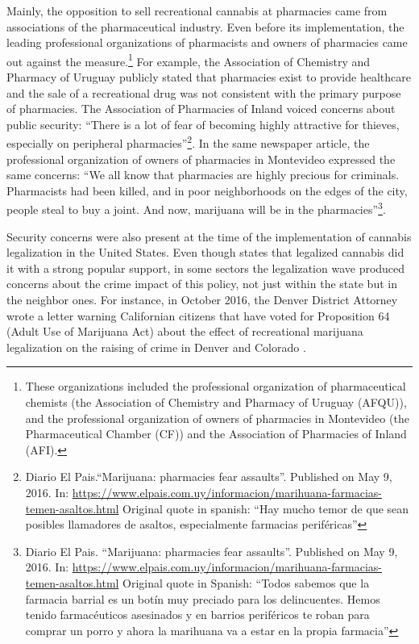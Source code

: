 \documentclass[11pt]{article}
\begin{document}
Mainly, the opposition to sell recreational cannabis at pharmacies came from associations of the pharmaceutical industry. Even before its implementation, the leading professional organizations of pharmacists and owners of pharmacies came out against the measure.\footnote{These organizations included the professional organization of pharmaceutical chemists (the Association of Chemistry and Pharmacy of Uruguay (AFQU)), and the professional organization of owners of pharmacies in Montevideo (the Pharmaceutical Chamber (CF)) and the Association of Pharmacies of Inland (AFI).} For example, the Association of Chemistry and Pharmacy of Uruguay publicly stated that pharmacies exist to provide healthcare and the sale of a recreational drug was not consistent with the primary purpose of pharmacies. The Association of Pharmacies of Inland voiced concerns about public security: ``There is a lot of fear of becoming highly attractive for thieves, especially on peripheral pharmacies''\footnote{Diario El Pais.``Marijuana: pharmacies fear assaults''. Published on May 9, 2016. In: \url{https://www.elpais.com.uy/informacion/marihuana-farmacias-temen-asaltos.html} Original quote in spanish: ``Hay mucho temor de que sean posibles llamadores de asaltos, especialmente farmacias periféricas''}. In the same newspaper article, the professional organization of owners of pharmacies in Montevideo expressed the same concerns: ``We all know that pharmacies are highly precious for criminals. Pharmacists had been killed, and in poor neighborhoods on the edges of the city, people steal to buy a joint. And now, marijuana will be in the pharmacies''\footnote{Diario El Pais. ``Marijuana: pharmacies fear assaults''. Published on May 9, 2016. In: \url{https://www.elpais.com.uy/informacion/marihuana-farmacias-temen-asaltos.html} Original quote in Spanish:  ``Todos sabemos que la farmacia barrial es un botín muy preciado para los delincuentes. Hemos tenido farmacéuticos asesinados y en barrios periféricos te roban para comprar un porro y ahora la marihuana va a estar en la propia farmacia''}.

Security concerns were also present at the time of the implementation of cannabis legalization in the United States. Even though states that legalized cannabis did it with a strong popular support, in some sectors the legalization wave produced concerns about the crime impact of this policy, not just within the state but in the neighbor ones. For instance, in October 2016, the Denver District Attorney wrote a letter warning Californian citizens that have voted for Proposition 64 (Adult Use of Marijuana Act) about the effect of recreational marijuana legalization on the raising of crime in Denver and Colorado \citep{dragone2019crime}.
\end{document}
